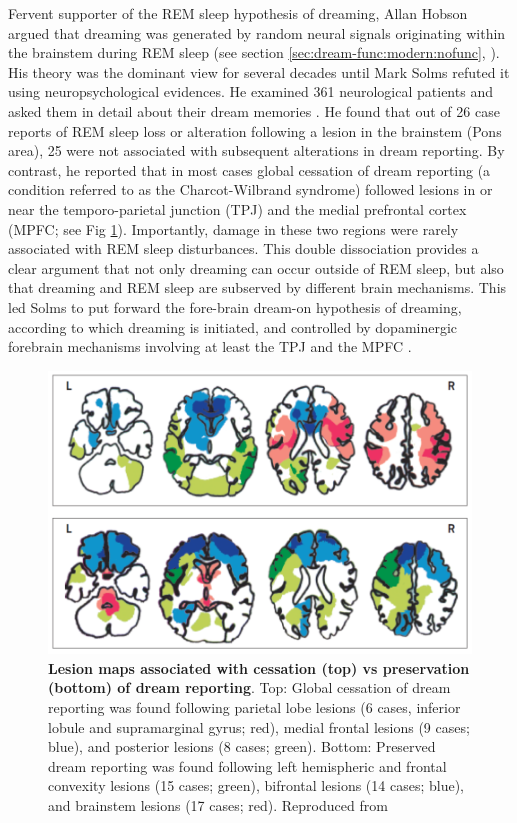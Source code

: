 Fervent supporter of the REM sleep hypothesis of dreaming, Allan Hobson argued that dreaming was generated by random neural signals originating within the brainstem during REM sleep (see section \ref{sec:dream-func:modern:nofunc}, \citealp{hobson_dream_1998}). His theory was the dominant view for several decades until Mark Solms refuted it using neuropsychological evidences. He examined 361 neurological patients and asked them in detail about their dream memories \citep{solms_neuropsychology_1997}. He found that out of 26 case reports of REM sleep loss or alteration following a lesion in the brainstem (Pons area), 25 were not associated with subsequent alterations in dream reporting. By contrast, he reported that in most cases global cessation of dream reporting (a condition referred to as the Charcot-Wilbrand syndrome) followed lesions in or near the temporo-parietal junction (TPJ) and the medial prefrontal cortex (MPFC; see Fig \ref{fig:intro:lesions}). Importantly, damage in these two regions were rarely associated with REM sleep disturbances. This double dissociation provides a clear argument that not only dreaming can occur outside of REM sleep, but also that dreaming and REM sleep are subserved by different brain mechanisms. This led Solms to put forward the fore-brain dream-on hypothesis of dreaming, according to which dreaming is initiated, and controlled by dopaminergic forebrain mechanisms involving at least the TPJ and the MPFC \citep{solms_dreaming_2000}.

\begin{figure}[htb]
	\includegraphics[width=\textwidth]{Fig/Intro/Intro_Lesions/Intro_Lesions.png}
	\caption[Lesion maps associated with cessation vs preservation of dream reporting]{\textbf{Lesion maps associated with cessation (top) vs preservation (bottom) of dream reporting}. Top: Global cessation of dream reporting was found following parietal lobe lesions (6 cases, inferior lobule and supramarginal gyrus; red), medial frontal lesions (9 cases; blue), and posterior lesions (8 cases; green). Bottom: Preserved dream reporting was found following left hemispheric and frontal convexity lesions (15 cases; green), bifrontal lesions (14 cases; blue), and brainstem lesions (17 cases; red). Reproduced from \citet{schwartz_dreaming:_2005}}
	\label{fig:intro:lesions}
\end{figure}

